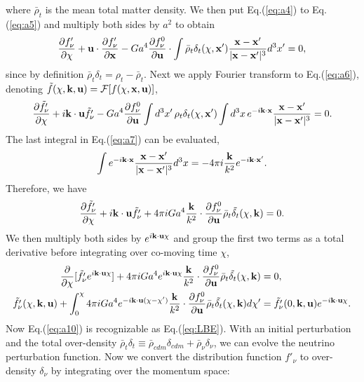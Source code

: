 where $\bar \rho_t$ is the mean total matter density. We then put Eq.(\ref{eq:a4}) to Eq.(\ref{eq:a5}) and multiply both sides by $a^2$ to obtain
\begin{equation}
\label{eq:a6}
    \pdv{f'_\nu}{\chi} + \bold u \cdot \pdv{f'_\nu}{\bold x} - Ga^4 \pdv{f_\nu^0}{\bold u} \cdot \int \bar \rho_t \delta_t( \chi, \bold x') \frac{\bold{x - x'}}{|\bold{x-x'}|^3 } d^3x' = 0,
\end{equation}
since by definition $\bar \rho_t \delta_t = \rho_t - \bar \rho_t$. Next we apply Fourier transform to Eq.(\ref{eq:a6}),  denoting $\Tilde{f}(\chi, \bold k ,\bold u) = \mathcal{F}[f(\chi, \bold x, \bold u)]$,
\begin{equation}
\label{eq:a7}
    \pdv{\Tilde{f'_\nu}}{\chi} + i\bold k \cdot \bold u \Tilde{f'_\nu} - Ga^4 \pdv{f^0_\nu}{\bold u} \int d^3x' \, \rho_t \delta_t(\chi, \bold x') \int d^3x\, e^{-i\bold k \cdot \bold x} \frac{\bold{x - x'}}{|\bold{x-x'}|^3 }  = 0.
\end{equation}
The last integral in Eq.(\ref{eq:a7}) can be evaluated,
\begin{equation}
    \int e^{-i\bold k \cdot \bold x} \frac{\bold{x - x'}}{|\bold{x-x'}|^3 } d^3x = -4\pi i \frac{\bold k}{k^2} e^{-i\bold k \cdot \bold x'}.
\end{equation}
Therefore, we have
\begin{equation}
    \pdv{\Tilde{f'_\nu}}{\chi} + i\bold k \cdot \bold u \Tilde{f'_\nu} + 4 \pi i Ga^4 \frac{\bold k}{k^2} \cdot \pdv{f^0_\nu}{\bold u} \bar \rho_t \Tilde{\delta_t}(\chi, \bold k) = 0.
\end{equation}
We then multiply both sides by $ e^{i \bold k \cdot \bold u \chi} $ and group the first two terms as a total derivative before integrating over co-moving time $\chi$,
\begin{align}
\label{eq:a10}
    \pdv{}{\chi}[\Tilde{f'_\nu} e^{i\bold k \cdot \bold u \chi}] + 4 \pi i Ga^4 e^{i \bold k \cdot \bold u \chi} \frac{\bold k}{k^2} \cdot \pdv{f^0_\nu}{\bold u} \bar \rho_t \Tilde{\delta_t}(\chi, \bold k) &= 0  \nonumber, \\
    \Tilde{f'_\nu}(\chi, \bold k, \bold u) + \int^\chi_0 4\pi iGa^4 e^{-i \bold k \cdot \bold u (\chi-\chi')} \frac{\bold k}{k^2} \cdot \pdv{f^0_\nu}{\bold u} \bar \rho_t \Tilde{\delta_t}(\chi, \bold k) d\chi' &= \Tilde{f'_\nu}(0, \bold k, \bold u) e^{-i \bold k \cdot \bold u \chi}.
\end{align}
Now Eq.(\ref{eq:a10}) is recognizable as Eq.(\ref{eq:LBE}). With an initial perturbation and the total over-density $\bar \rho_t \delta_t \equiv \bar \rho_{cdm} \delta_{cdm} + \bar \rho_\nu \delta_\nu$, we can evolve the neutrino perturbation function. Now we convert the distribution function $f'_\nu$ to over-density $\delta_\nu$ by integrating over the momentum space:
